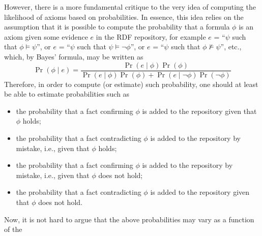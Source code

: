 \documentclass[conference]{IEEEtran}
\begin{document}


However, there is a more fundamental critique to the very idea of computing the likelihood
of axioms based on probabilities. In essence, this idea relies on the assumption
that it is possible to compute the probability that a formula $\phi$ is an axiom given
some evidence $e$ in the RDF repository, for example $e$ = ``$\psi$ such that $\phi\models\psi$'',
or $e$ = ``$\psi$ such that $\psi\models\neg\phi$'',
or $e$ = ``$\psi$ such that $\phi\not\models\psi$'', etc.,
which, by Bayes' formula, may be written as
\begin{equation}
  \Pr(\phi \mid e) =
    \frac{\Pr(e \mid \phi)\Pr(\phi)}{\Pr(e \mid \phi)\Pr(\phi) + \Pr(e \mid \neg\phi)\Pr(\neg\phi)}
\end{equation}
Therefore, in order to compute (or estimate) such probability,
one should at least be able to estimate probabilities such as
\begin{itemize}
\item the probability that a fact confirming $\phi$ is added to the repository
  given that $\phi$ holds;
\item the probability that a fact contradicting $\phi$ is added to the repository
  by mistake, i.e., given that $\phi$ holds;
\item the probability that a fact confirming $\phi$ is added to the repository
  by mistake, i.e., given that $\phi$ does not hold;
\item the probability that a fact contradicting $\phi$ is added to the repository
  given that $\phi$ does not hold.
\end{itemize}
Now, it is not hard to argue that the above probabilities may vary as a function of the
\end{document}
